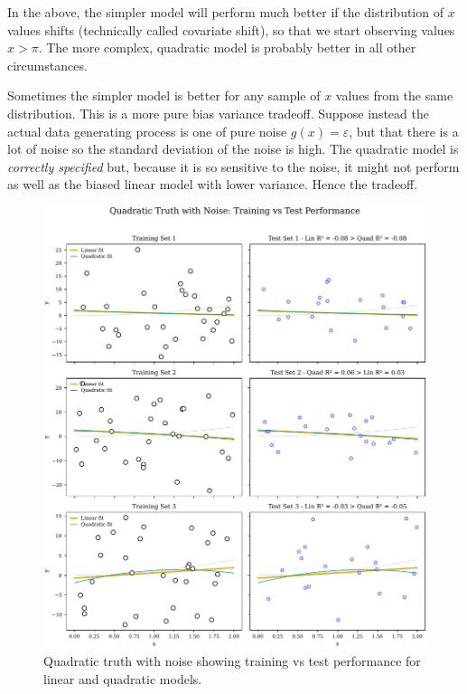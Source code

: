 In the above, the simpler model will perform much better if the distribution of $x$ values shifts (technically called covariate shift), so that we start observing values $x>\pi$. The more complex, quadratic model is probably better in all other circumstances.

Sometimes the simpler model is better for any sample of $x$ values from the same distribution. This is a more pure bias variance tradeoff. Suppose instead the actual data generating process is one of pure noise $g(x) = \varepsilon$, but that there is a lot of noise so the standard deviation of the noise is high. The quadratic model is \textit{correctly specified} but, because it is so sensitive to the noise, it might not perform as well as the biased linear model with lower variance. Hence the tradeoff.

\begin{figure}[H]
\centering
\includegraphics[width=\textwidth]{images/scatter_bias_variance.pdf}
\caption{Quadratic truth with noise showing training vs test performance for linear and quadratic models.}
\label{fig:bias-variance}
\end{figure}

